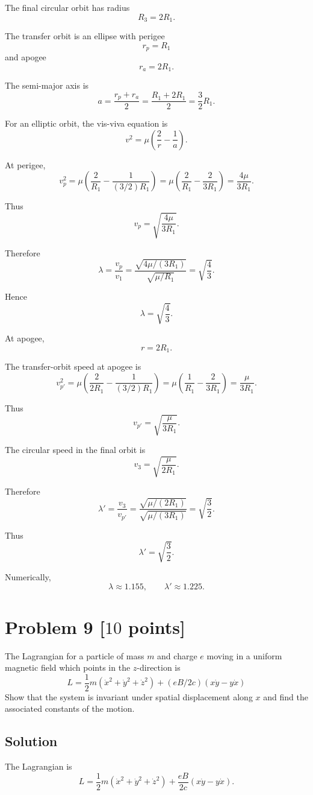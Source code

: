 \documentclass[11pt, a4paper]{article} %
\begin{document}
The final circular orbit has radius
\[
R_3=2R_1.
\]

The transfer orbit is an ellipse with perigee
\[
r_p=R_1
\]
and apogee
\[
r_a=2R_1.
\]

The semi-major axis is
\[
a=\frac{r_p+r_a}{2}
=
\frac{R_1+2R_1}{2}
=
\frac32 R_1.
\]

For an elliptic orbit, the vis-viva equation is
\[
v^2=\mu\left(\frac{2}{r}-\frac{1}{a}\right).
\]

At perigee,
\[
v_p^2
=
\mu\left(
\frac{2}{R_1}
-
\frac{1}{(3/2)R_1}
\right)
=
\mu\left(
\frac{2}{R_1}
-
\frac{2}{3R_1}
\right)
=
\frac{4\mu}{3R_1}.
\]

Thus
\[
v_p=\sqrt{\frac{4\mu}{3R_1}}.
\]

Therefore
\[
\lambda
=
\frac{v_p}{v_1}
=
\frac{\sqrt{4\mu/(3R_1)}}{\sqrt{\mu/R_1}}
=
\sqrt{\frac43}.
\]

Hence
\[
\boxed{
\lambda=\sqrt{\frac43}.
}
\]

At apogee,
\[
r=2R_1.
\]

The transfer-orbit speed at apogee is
\[
v_{p'}^2
=
\mu
\left(
\frac{2}{2R_1}
-
\frac{1}{(3/2)R_1}
\right)
=
\mu
\left(
\frac{1}{R_1}
-
\frac{2}{3R_1}
\right)
=
\frac{\mu}{3R_1}.
\]

Thus
\[
v_{p'}=\sqrt{\frac{\mu}{3R_1}}.
\]

The circular speed in the final orbit is
\[
v_3=\sqrt{\frac{\mu}{2R_1}}.
\]

Therefore
\[
\lambda'
=
\frac{v_3}{v_{p'}}
=
\frac{\sqrt{\mu/(2R_1)}}{\sqrt{\mu/(3R_1)}}
=
\sqrt{\frac32}.
\]

Thus
\[
\boxed{
\lambda'=\sqrt{\frac32}.
}
\]

Numerically,
\[
\lambda\approx 1.155,
\qquad
\lambda'\approx 1.225.
\]


\newpage
\section*{Problem 9 [$10$ points]}
The Lagrangian for a particle of mass $m$ and charge $e$ moving in a uniform magnetic field which points in the $z$-direction is
\[
L = \frac{1}{2}m({\dot{x}^2} + {\dot{y}^2}  + {\dot{z}^2} ) + (eB/2c)(x\dot{y} - y\dot{x})
\]
Show that the system is invariant under spatial displacement along $x$ and find the associated constants of the motion.

\subsection*{Solution}
The Lagrangian is
\[
L
=
\frac12 m(\dot x^2+\dot y^2+\dot z^2)
+
\frac{eB}{2c}(x\dot y-y\dot x).
\]
\end{document}
